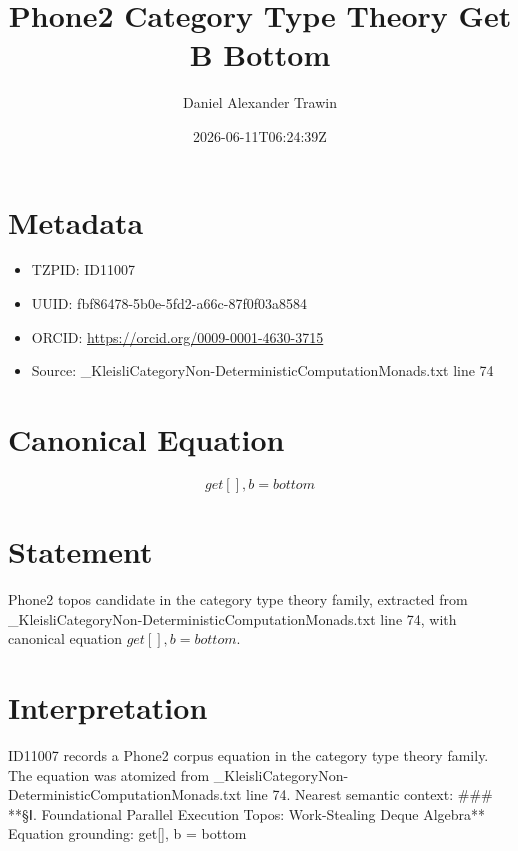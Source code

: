 \documentclass[11pt]{article}
\title{Phone2 Category Type Theory Get B Bottom}
\author{Daniel Alexander Trawin}
\date{2026-06-11T06:24:39Z}
\begin{document}
\maketitle
\section*{Metadata}
\begin{itemize}
\item TZPID: ID11007
\item UUID: fbf86478-5b0e-5fd2-a66c-87f0f03a8584
\item ORCID: \url{https://orcid.org/0009-0001-4630-3715}
\item Source: _KleisliCategoryNon-DeterministicComputationMonads.txt line 74
\end{itemize}
\section*{Canonical Equation}
\[
get[], b = bottom
\]
\section*{Statement}
Phone2 topos candidate in the category type theory family, extracted from _KleisliCategoryNon-DeterministicComputationMonads.txt line 74, with canonical equation $get[], b = bottom$.
\section*{Interpretation}
ID11007 records a Phone2 corpus equation in the category type theory family. The equation was atomized from _KleisliCategoryNon-DeterministicComputationMonads.txt line 74. Nearest semantic context: ### **§Ⅰ. Foundational Parallel Execution Topos: Work-Stealing Deque Algebra** Equation grounding: get[], b = bottom
\end{document}
